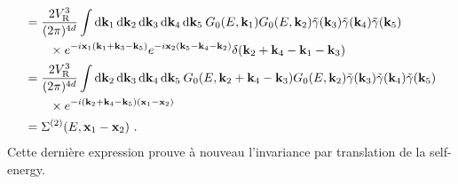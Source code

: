 \begin{align}
&=\frac{2V_{\mathrm{R}}^3}{(2\pi)^{4d}} \int{\mathop{}\mathopen{}\mathrm{d}\mathbf{k}_{\mathrm{1}}\mathop{}\mathopen{}\mathrm{d}\mathbf{k}_{\mathrm{2}}\mathop{}\mathopen{}\mathrm{d}\mathbf{k}_{\mathrm{3}}\mathop{}\mathopen{}\mathrm{d}\mathbf{k}_{\mathrm{4}}\mathop{}\mathopen{}\mathrm{d}\mathbf{k}_{\mathrm{5}}\: G_0(E,\mathbf{k}_{\mathrm{1}}) G_0(E,\mathbf{k}_{\mathrm{2}}) \tilde{\gamma}(\mathbf{k}_{\mathrm{3}})\tilde{\gamma}(\mathbf{k}_{\mathrm{4}})\tilde{\gamma}(\mathbf{k}_{\mathrm{5}})}\\
&\nonumber \qquad \times e^{-i\mathbf{x}_{\mathrm{1}} (\mathbf{k}_{\mathrm{1}}+\mathbf{k}_{\mathrm{3}}-\mathbf{k}_{\mathrm{5}})} e^{-i\mathbf{x}_{\mathrm{2}}(\mathbf{k}_{\mathrm{5}}-\mathbf{k}_{\mathrm{4}}-\mathbf{k}_{\mathrm{2}})} \delta(\mathbf{k}_{\mathrm{2}} +\mathbf{k}_{\mathrm{4}} -\mathbf{k}_{\mathrm{1}} -\mathbf{k}_{\mathrm{3}}) \\
&= \frac{2V_{\mathrm{R}}^3}{(2\pi)^{4d}} \int{\mathop{}\mathopen{}\mathrm{d}\mathbf{k}_{\mathrm{2}}\mathop{}\mathopen{}\mathrm{d}\mathbf{k}_{\mathrm{3}}\mathop{}\mathopen{}\mathrm{d}\mathbf{k}_{\mathrm{4}}\mathop{}\mathopen{}\mathrm{d}\mathbf{k}_{\mathrm{5}}\: G_0(E,\mathbf{k}_{\mathrm{2}}+\mathbf{k}_{\mathrm{4}}-\mathbf{k}_{\mathrm{3}}) G_0(E,\mathbf{k}_{\mathrm{2}})\tilde{\gamma}(\mathbf{k}_{\mathrm{3}})\tilde{\gamma}(\mathbf{k}_{\mathrm{4}})\tilde{\gamma}(\mathbf{k}_{\mathrm{5}})} \\
&\nonumber \qquad \times e^{-i(\mathbf{k}_{\mathrm{2}}+\mathbf{k}_{\mathrm{4}}-\mathbf{k}_{\mathrm{5}})(\mathbf{x}_{\mathrm{1}}-\mathbf{x}_{\mathrm{2}})}\\
&=\Sigma^{(2)}(E,\mathbf{x}_{\mathrm{1}}-\mathbf{x}_{\mathrm{2}}) \text{ .}
\end{align}
Cette dernière expression prouve à nouveau l'invariance par translation de la self-energy.

